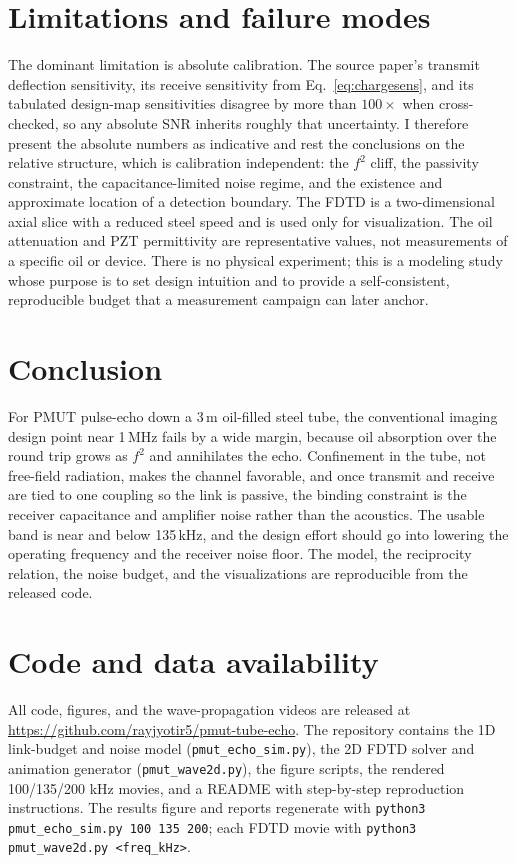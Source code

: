\documentclass{article}
\newcommand{\fbound}{135}   %
\begin{document}
\section{Limitations and failure modes}
The dominant limitation is absolute calibration. The source paper's transmit deflection
sensitivity, its receive sensitivity from Eq.~\eqref{eq:chargesens}, and its tabulated design-map sensitivities
disagree by more than $100\times$ when cross-checked, so any absolute SNR inherits roughly that
uncertainty. I therefore present the absolute numbers as indicative and rest the conclusions on
the relative structure, which is calibration independent: the $f^2$ cliff, the passivity
constraint, the capacitance-limited noise regime, and the existence and approximate location of
a detection boundary. The FDTD is a two-dimensional axial slice with a reduced steel speed and is
used only for visualization. The oil attenuation and PZT permittivity are representative values,
not measurements of a specific oil or device. There is no physical experiment; this is a modeling
study whose purpose is to set design intuition and to provide a self-consistent, reproducible
budget that a measurement campaign can later anchor.

\section{Conclusion}
For PMUT pulse-echo down a 3\,m oil-filled steel tube, the conventional imaging design point near
1\,MHz fails by a wide margin, because oil absorption over the round trip grows as $f^2$ and
annihilates the echo. Confinement in the tube, not free-field radiation, makes the channel
favorable, and once transmit and receive are tied to one coupling so the link is passive, the
binding constraint is the receiver capacitance and amplifier noise rather than the acoustics. The
usable band is near and below \fbound\,kHz, and the design effort should go into lowering the
operating frequency and the receiver noise floor. The model, the reciprocity relation, the noise
budget, and the visualizations are reproducible from the released code.

\section{Code and data availability}
All code, figures, and the wave-propagation videos are released at
\url{https://github.com/rayjyotir5/pmut-tube-echo}. The repository contains the 1D
link-budget and noise model (\texttt{pmut\_echo\_sim.py}), the 2D FDTD solver and
animation generator (\texttt{pmut\_wave2d.py}), the figure scripts, the rendered
100/135/200 kHz movies, and a README with step-by-step reproduction instructions. The
results figure and reports regenerate with \texttt{python3 pmut\_echo\_sim.py 100 135 200};
each FDTD movie with \texttt{python3 pmut\_wave2d.py <freq\_kHz>}.
\end{document}
